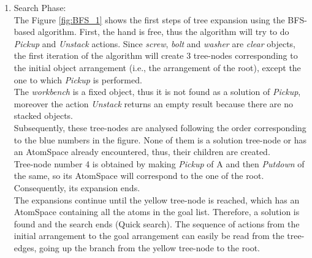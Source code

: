 \begin{enumerate}
	\item Search Phase: \\
The Figure \ref{fig:BFS_1} shows the first steps of tree expansion using the BFS-based algorithm.
First, the hand is free, thus the algorithm will try to do \textit{Pickup} and \textit{Unstack} actions. Since \textit{screw}, \textit{bolt} and \textit{washer} are \textit{clear} objects, the first iteration of the algorithm will create 3 tree-nodes corresponding to the initial object arrangement (i.e., the arrangement of the root), except the one to which \textit{Pickup} is performed. \\
The \textit{workbench} is a fixed object, thus it is not found as a solution of \textit{Pickup}, moreover the action \textit{Unstack} returns an empty result because there are no stacked objects\footnotemark{}.
\\Subsequently, these tree-nodes are analysed following the order corresponding to the blue numbers in the figure. None of them is a solution tree-node or has an AtomSpace already encountered, thus, their children are created. \\
Tree-node number 4 is obtained by making \textit{Pickup} of A and then \textit{Putdown} of the same, so its AtomSpace will correspond to the one of the root. Consequently, its expansion ends. \\
The expansions continue until the yellow tree-node is reached, which has an AtomSpace containing all the atoms in the goal list. Therefore, a solution is found and the search ends (Quick search).
The sequence of actions from the initial arrangement to the goal arrangement can easily be read from the tree-edges, going up the branch from the yellow tree-node to the root.


\end{enumerate}
